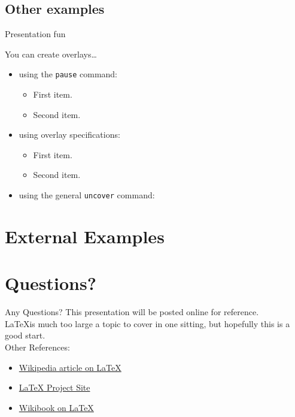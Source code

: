 \documentclass{beamer}
\begin{document}
\subsection{Other examples}
\begin{frame}{Presentation fun}

  You can create overlays\dots
  \begin{itemize}
  \item using the \texttt{pause} command:
    \begin{itemize}
    \item
      First item.
      \pause
    \item    
      Second item.
    \end{itemize}
  \item
    using overlay specifications:
    \begin{itemize}
    \item<3->
      First item.
    \item<4->
      Second item.
    \end{itemize}
  \item
    using the general \texttt{uncover} command:
    \begin{itemize}
    \end{itemize}
  \end{itemize}
\end{frame}

\section {External Examples}

\section*{Questions?}

\begin{frame}{Any Questions?}
  This presentation will be posted online for reference.\\
  
  \LaTeX is much too large a topic to cover in one sitting, but hopefully this is a good start.\\
  
  Other References:
  \begin{itemize}
    \item \href{http://en.wikipedia.org/wiki/LaTeX}{Wikipedia article on \LaTeX}
    \item \href{http://www.latex-project.org/}{\LaTeX{ }Project Site}
    \item \href{http://en.wikibooks.org/wiki/LaTeX/}{Wikibook on \LaTeX}
  \end{itemize}
\end{frame}
\end{document}
